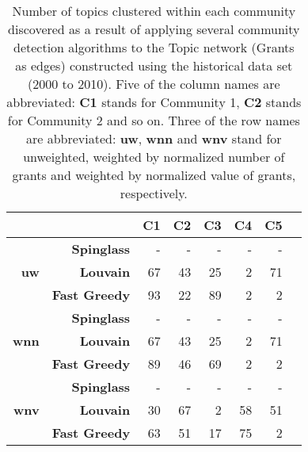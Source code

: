 \begin{table}[!htbp]
\centering
\caption[Number of topics clustered within each community discovered in the Topic network (Grants as edges) constructed using the historical data set (2000 to 2010)]{Number of topics clustered within each community discovered as a result of applying several community detection algorithms to the Topic network (Grants as edges) constructed using the historical data set (2000 to 2010). Five of the column names are abbreviated: \textbf{C1} stands for Community 1, \textbf{C2} stands for Community 2 and so on. Three of the row names are abbreviated: \textbf{uw}, \textbf{wnn} and \textbf{wnv} stand for unweighted, weighted by normalized number of grants and weighted by normalized value of grants, respectively.}
\label{table:topic_a_past1_numbers_appendix}
\begin{tabular}{r|r|r|r|r|r|r|r}
\textbf{} & \textbf{} & \textbf{C1} & \textbf{C2} & \textbf{C3} & \textbf{C4} & \textbf{C5}\\
\hline
\multirow{3}{*}{\textbf{uw}}
& \textbf{Spinglass} & {-} & {-} & {-} & {-} & {-}\\
& \textbf{Louvain} & {67} & {43} & {25} & {2} & {71}\\
& \textbf{Fast Greedy} & {93} & {22} & {89} & {2} & {2}\\
\hline
\multirow{3}{*}{\textbf{wnn}}
& \textbf{Spinglass} & {-} & {-} & {-} & {-} & {-}\\
& \textbf{Louvain} & {67} & {43} & {25} & {2} & {71}\\
& \textbf{Fast Greedy} & {89} & {46} & {69} & {2} & {2}\\
\hline
\multirow{3}{*}{\textbf{wnv}}
& \textbf{Spinglass} & {-} & {-} & {-} & {-} & {-}\\
& \textbf{Louvain} & {30} & {67} & {2} & {58} & {51}\\
& \textbf{Fast Greedy} & {63} & {51} & {17} & {75} & {2}
\end{tabular}
\end{table}


